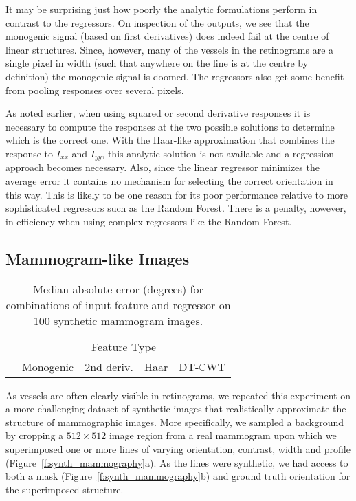 \documentclass{bmvc2k}
\newcommand{\fref}[1]{Figure~\ref{#1}}
\def\Ixx{I_{xx}}
\def\Iyy{I_{yy}}
\def\dtcwt{DT-$\mathbb{C}$WT}
\begin{document}
It may be surprising just how poorly the analytic formulations perform in contrast to the regressors. On inspection of the outputs, we see that the monogenic signal (based on first derivatives) does indeed fail at the centre of linear structures. Since, however, many of the vessels in the retinograms are a single pixel in width (such that anywhere on the line is at the centre by definition) the monogenic signal is doomed. The regressors also get some benefit from pooling responses over several pixels.

As noted earlier, when using squared or second derivative responses it is necessary to compute the responses at the two possible solutions to determine which is the correct one. With the Haar-like approximation that combines the response to $\Ixx$ and $\Iyy$, this analytic solution is not available and a regression approach becomes necessary. Also, since the linear regressor minimizes the average error it contains no mechanism for selecting the correct orientation in this way. This is likely to be one reason for its poor performance relative to more sophisticated regressors such as the Random Forest. There is a penalty, however, in efficiency when using complex regressors like the Random Forest.


\subsection{Mammogram-like Images}
\label{s:expts_synth_mammography}
\begin{table}[t]
\centering
\begin{tabular}{l|c c c c}
							& \multicolumn{4}{c}{Feature Type} \\
							& Monogenic		& 2nd deriv.	& Haar				& \dtcwt \\
\hline

\end{tabular}
%
\caption{Median absolute error (degrees) for combinations of input feature and regressor on 100 synthetic mammogram images.}
\label{t:synth_mammography}
\end{table}

As vessels are often clearly visible in retinograms, we repeated this experiment on a more challenging dataset of synthetic images that realistically approximate the structure of mammographic images. More specifically, we sampled a background by cropping a $512{\times}512$ image region from a real mammogram upon which we superimposed one or more lines of varying orientation, contrast, width and profile (\fref{f:synth_mammography}a). As the lines were synthetic, we had access to both a mask (\fref{f:synth_mammography}b) and ground truth orientation for the superimposed structure.
\end{document}
